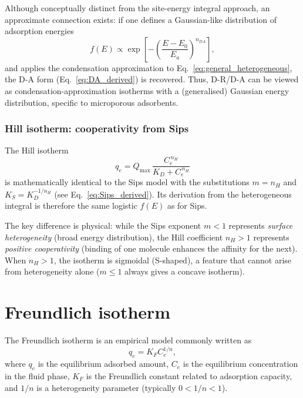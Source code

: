 \documentclass[12pt]{article}
\begin{document}
	Although conceptually distinct from the site-energy integral
	approach, an approximate connection exists: if one defines a
	Gaussian-like distribution of adsorption energies
	\begin{equation}
		f(E) \propto \exp\!\left[-\left(\frac{E - E_0}{E_a}\right)^{n_{DA}}
		\right],
	\end{equation}
	and applies the condensation approximation to
	Eq.~\eqref{eq:general_heterogeneous}, the D-A form
	(Eq.~\eqref{eq:DA_derived}) is recovered. Thus, D-R/D-A can be
	viewed as condensation-approximation isotherms with a
	(generalised) Gaussian energy distribution, specific to
	microporous adsorbents.

	\subsubsection{Hill isotherm: cooperativity from Sips}

	The Hill isotherm
	\begin{equation}
		q_e = Q_{\max}\,\frac{C_e^{\,n_H}}{K_D + C_e^{\,n_H}}
	\end{equation}
	is mathematically identical to the Sips model with the
	substitutions $m = n_H$ and $K_S = K_D^{-1/n_H}$ (see
	Eq.~\eqref{eq:Sips_derived}). Its derivation from the
	heterogeneous integral is therefore the same logistic
	$f(E)$ as for Sips.

	The key difference is physical: while the Sips exponent $m < 1$
	represents \emph{surface heterogeneity} (broad energy
	distribution), the Hill coefficient $n_H > 1$ represents
	\emph{positive cooperativity} (binding of one molecule enhances
	the affinity for the next). When $n_H > 1$, the isotherm is
	sigmoidal (S-shaped), a feature that cannot arise from
	heterogeneity alone ($m \leq 1$ always gives a concave
	isotherm).

	\section{Freundlich isotherm}
	
	The Freundlich isotherm is an empirical model commonly written as
	\begin{equation}
		q_e = K_F C_e^{1/n},
		\label{eq:Freundlich}
	\end{equation}
	where \(q_e\) is the equilibrium adsorbed amount, \(C_e\) is the
	equilibrium concentration in the fluid phase, \(K_F\) is the
	Freundlich constant related to adsorption capacity, and \(1/n\)
	is a heterogeneity parameter (typically \(0 < 1/n < 1\)).
	
\end{document}
